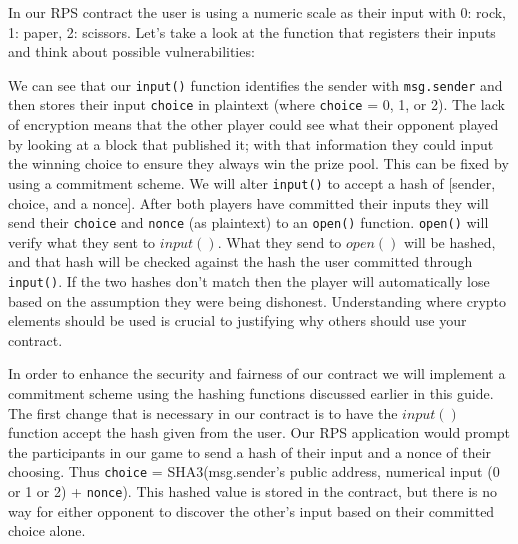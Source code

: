 \documentclass[12pt]{article}
\begin{document}
In our RPS contract the user is using a numeric scale as their input with 0: rock, 1: paper, 2: scissors. Let's take a look at the function that registers their inputs and think about possible vulnerabilities:


We can see that our \texttt{input()} function identifies the sender with \texttt{msg.sender} and then stores their input \texttt{choice} in plaintext (where \texttt{choice} = 0, 1, or 2). The lack of encryption means that the other player could see what their opponent played by looking at a block that published it; with that information they could input the winning choice to ensure they always win the prize pool. This can be fixed by using a commitment scheme. We will alter \texttt{input()} to accept a hash of [sender, choice, and a nonce]. After both players have committed their inputs they will send their \texttt{choice} and \texttt{nonce} (as plaintext) to an \texttt{open()} function. \texttt{open()} will verify what they sent to $input()$. What they send to $open()$ will be hashed, and that hash will be checked against the hash the user committed through \texttt{input()}. If the two hashes don't match then the player will automatically lose based on the assumption they were being dishonest. Understanding where crypto elements should be used is crucial to justifying why others should use your contract. 

In order to enhance the security and fairness of our contract we will implement a commitment scheme using the hashing functions discussed earlier in this guide. The first change that is necessary in our contract is to have the $input()$ function accept the hash given from the user. Our RPS application would prompt the participants in our game to send a hash of their input and a nonce of their choosing. Thus \texttt{choice} = SHA3(msg.sender's public address, numerical input (0 or 1 or 2) + \texttt{nonce}). This hashed value is stored in the contract, but there is no way for either opponent to discover the other's input based on their committed choice alone.\\
\end{document}
